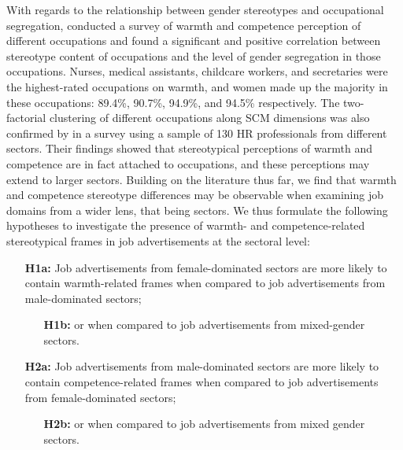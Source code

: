 \documentclass[jou]{apa7}
\begin{document}
With regards to the relationship between gender stereotypes and occupational segregation, \textcite{heStereotypesWorkOccupational2019} conducted a survey of warmth and competence perception of different occupations and found a significant and positive correlation between stereotype content of occupations and the level of gender segregation in those occupations. Nurses, medical assistants, childcare workers, and secretaries were the highest-rated occupations on warmth, and women made up the majority in these occupations: 89.4\%, 90.7\%, 94.9\%, and 94.5\% respectively. The two-factorial clustering of different occupations along SCM dimensions was also confirmed by \textcite{strinicOccupationalStereotypesProfessionals2021} in a survey using a sample of 130 HR professionals from different sectors. Their findings showed that stereotypical perceptions of warmth and competence are in fact attached to occupations, and these perceptions may extend to larger sectors. Building on the literature thus far, we find that warmth and competence stereotype differences may be observable when examining job domains from a wider lens, that being sectors. We thus formulate the following hypotheses to investigate the presence of warmth- and competence-related stereotypical frames in job advertisements at the sectoral level:

\begin{enumerate}
\item[\textbf{H1a:}] Job advertisements from female-dominated sectors are more likely to contain warmth-related frames when compared to job advertisements from male-dominated sectors;

\begin{enumerate}
\item[\textbf{H1b:}] or when compared to job advertisements from mixed-gender sectors.
\end{enumerate}

\item[\textbf{H2a:}] Job advertisements from male-dominated sectors are more likely to contain competence-related frames when compared to job advertisements from female-dominated sectors;

\begin{enumerate}
\item[\textbf{H2b:}] or when compared to job advertisements from mixed gender sectors.

\end{enumerate}
\end{enumerate}
\end{document}
